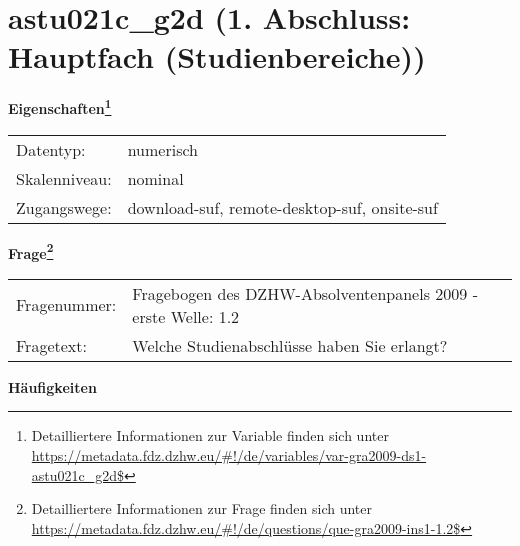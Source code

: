 
    \setcounter{footnote}{0}

    \vspace*{-1.8cm}
	\section{astu021c\_g2d (1. Abschluss: Hauptfach (Studienbereiche))}
	\label{section:astu021c_g2d}



    \vspace*{0.5cm}
    \noindent\textbf{Eigenschaften\footnote{Detailliertere Informationen zur Variable finden sich unter
		\url{https://metadata.fdz.dzhw.eu/\#!/de/variables/var-gra2009-ds1-astu021c_g2d$}}}\\
	\begin{tabularx}{\hsize}{@{}lX}
	Datentyp: & numerisch \\
	Skalenniveau: & nominal \\
	Zugangswege: &
	  download-suf, 
	  remote-desktop-suf, 
	  onsite-suf
 \\
    \end{tabularx}



				\vspace*{0.5cm}
                \noindent\textbf{Frage\footnote{Detailliertere Informationen zur Frage finden sich unter
		              \url{https://metadata.fdz.dzhw.eu/\#!/de/questions/que-gra2009-ins1-1.2$}}}\\
				\begin{tabularx}{\hsize}{@{}lX}
					Fragenummer: &
					  Fragebogen des DZHW-Absolventenpanels 2009 - erste Welle:
					  1.2
 \\
					Fragetext: & Welche Studienabschlüsse haben Sie erlangt? \\
				\end{tabularx}





        		\vspace*{0.5cm}
                \noindent\textbf{Häufigkeiten}

